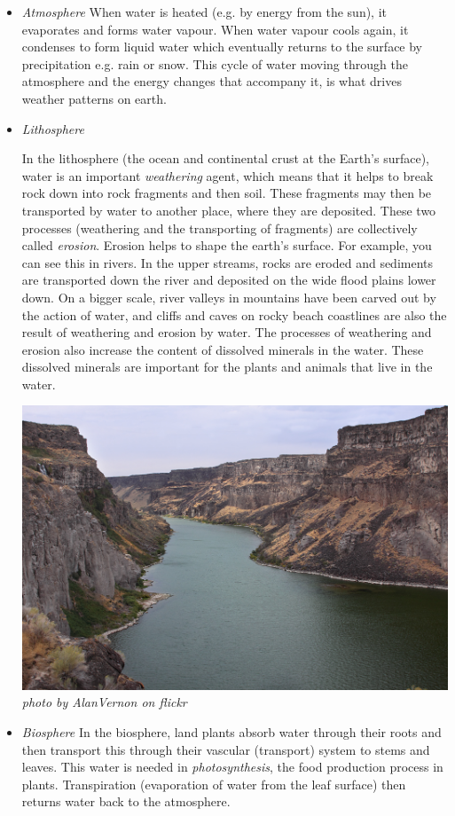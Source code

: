      \label{m38138*id334463}\begin{itemize}[noitemsep]
            \label{m38138*uid1}\item \textsl{Atmosphere}
When water is heated (e.g. by energy from the sun), it evaporates and forms water vapour. When water vapour cools again, it condenses to form liquid water which eventually returns to the surface by precipitation e.g. rain or snow. This cycle of water moving through the atmosphere and the energy changes that accompany it, is what drives weather patterns on earth.
\label{m38138*uid2}\item \textsl{Lithosphere} \\
\begin{minipage}{.6\textwidth}
In the lithosphere (the ocean and continental crust at the Earth's surface), water is an important \textsl{weathering} agent, which means that it helps to break rock down into rock fragments and then soil. These fragments may then be transported by water to another place, where they are deposited. These two processes (weathering and the transporting of fragments) are collectively called \textsl{erosion}. Erosion helps to shape the earth's surface. For example, you can see this in rivers. In the upper streams, rocks are eroded and sediments are transported down the river and deposited on the wide flood plains lower down. On a bigger scale, river valleys in mountains have been carved out by the action of water, and cliffs and caves on rocky beach coastlines are also the result of weathering and erosion by water. The processes of weathering and erosion also increase the content of dissolved minerals in the water. These dissolved minerals are important for the plants and animals that live in the water.
\end{minipage}
\begin{minipage}{.4\textwidth}
 \begin{center}
  \includegraphics[width=.6\textwidth]{photos/AlanVernon.jpg}\\
\textsl{photo by AlanVernon on flickr}
 \end{center}
\end{minipage}
\label{m38138*uid3}\item \textsl{Biosphere}
In the biosphere, land plants absorb water through their roots and then transport this through their vascular (transport) system to stems and leaves. This water is needed in \textsl{photosynthesis}, the food production process in plants. Transpiration (evaporation of water from the leaf surface) then returns water back to the atmosphere.
\end{itemize}


